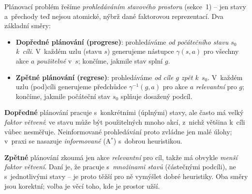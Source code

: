 Plánovací problém řešíme \emph{prohledáváním stavového prostoru} (sekce~1) -- jen stavy a~přechody teď nejsou atomické, nýbrž dané faktorovou reprezentací. Dva základní směry:

\begin{definice}
\begin{itemize}
  \item \textbf{Dopředné plánování (progrese)}: prohledáváme \emph{od počátečního stavu $s_0$ k~cíli}. V~každém uzlu (stavu $s$) generujeme nástupce $\gamma(s,a)$ pro všechny akce $a$ \emph{použitelné} v~$s$; končíme, jakmile stav splní $g$.
  \item \textbf{Zpětné plánování (regrese)}: prohledáváme \emph{od cíle $g$ zpět k~$s_0$}. V~každém uzlu (pod)cíli generujeme předchůdce $\gamma^{-1}(g,a)$ pro akce $a$ \emph{relevantní} pro $g$; končíme, jakmile počáteční stav $s_0$ splňuje dosažený podcíl.
\end{itemize}
\end{definice}

\begin{intuice}
\textbf{Dopředné} plánování pracuje s~konkrétními (úplnými) stavy, ale často má velký \emph{faktor větvení}: ve stavu může být použitelných mnoho akcí, z~nichž většina k~cíli vůbec nesměřuje. Neinformované prohledávání proto zvládne jen malé úlohy; v~praxi se nasazuje \emph{informované} (A${}^\ast$) s~dobrou heuristikou.

\textbf{Zpětné} plánování zkoumá jen akce \emph{relevantní} pro cíl, takže má obvykle \emph{menší faktor větvení}. Daní je, že pracuje s~\emph{množinami stavů} (částečnými podcíli), ne s~jednotlivými stavy -- je proto těžší pro ně vymýšlet dobré heuristiky. Oba směry jsou korektní; volba je věcí toho, kde je prostor užší.
\end{intuice}

